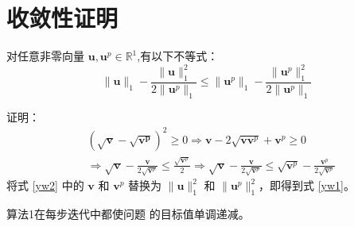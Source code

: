 \section{收敛性证明}
\begin{lemma}
   对任意非零向量 $\mathbf{u},\mathbf{u}^p\in\mathbb{R}^1$,有以下不等式：
   \begin{equation}
   \|\mathbf{u}\|_{1}-\frac{\|\mathbf{u}\|^{2}_{1}}{2\|\mathbf{u}^p\|_{1}}\le
   \|\mathbf{u}^p\|_{1}-\frac{\|\mathbf{u}^p\|^{2}_{1}}{2\|\mathbf{u}^p\|_{1}}
   \label{yw1}
   \end{equation}
\end{lemma}

证明：
\begin{equation}
\begin{aligned}
&(\sqrt{\mathbf{v}}-\sqrt{\mathbf{v^p}})^2\ge0
\Rightarrow\mathbf{v}-2\sqrt{\mathbf{vv}^p}+\mathbf{v}^p\ge0\\
&\Rightarrow\sqrt{\mathbf{v}}-\frac{\mathbf{v}}{2\sqrt{\mathbf{v}^p}}\le
\frac{\sqrt{\mathbf{v}^p}}{2}
\Rightarrow\sqrt{\mathbf{v}}-\frac{\mathbf{v}}{2\sqrt{\mathbf{v}^p}}\le
\sqrt{\mathbf{v}^p}-\frac{\mathbf{v}^p}{2\sqrt{\mathbf{v}^p}}
\end{aligned}
\label{yw2}
\end{equation}
将式 \eqref{yw2} 中的 $\mathbf{v}$ 和 $\mathbf{v}^p$ 替换为 $\|\mathbf{u}\|^{2}_{1}$ 和 $\|\mathbf{u}^p\|^{2}_{1}$，即得到式 \eqref{yw1}。

\begin{theorem}
   算法1在每步迭代中都使问题 的目标值单调递减。
\end{theorem}


